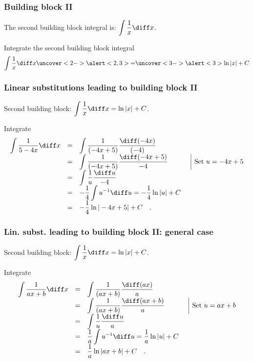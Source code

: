 \begin{frame}
\frametitle{Building block II}
The second building block integral is: $\displaystyle \int \frac{1}{x }\diff x$. 
\begin{example} Integrate the second building block integral 
\[
\int \frac{1}{x }\diff x \uncover<2->{\alert<2,3>{ =}}\uncover<3->{\alert<3>{\ln | x | +C} }
\]
\end{example}
\end{frame}
\begin{frame}
\frametitle{Linear substitutions leading to building block II}
Second building block: $\displaystyle \int \frac{1}{x }\diff x=\ln |x|+ C$. 
\begin{example} Integrate 
\[
\begin{array}{rcll|l}
\displaystyle \int \frac{1}{5-4x }\diff x&=&\displaystyle \int \frac{1}{(-4x+5) }\frac{\diff (-4 x)}{(-4)} \\
&=&\displaystyle \int \frac{1}{(-4x+5) }\frac{\diff (-4x+5)}{-4} &&\text{Set }u=-4x+5\\
&=&\displaystyle \int\frac{1}{u}\frac{\diff u}{-4}\\
&=&\displaystyle -\frac{1}{4}\int u^{-1} \diff u =-\frac{1}{4}\ln |u|+C\\
&=&\displaystyle-\frac{1}{4}\ln |-4x+5|  +C\quad .
\end{array}
\]

\end{example}
\end{frame}
\begin{frame}
\frametitle{Lin. subst. leading to building block II: general case}
Second building block: $\displaystyle \int \frac{1}{x }\diff x=\ln |x|+ C$. 
\begin{example} Integrate 
\[
\begin{array}{rcll|l}
\displaystyle \int \frac{1}{ax+b }\diff x&=&\displaystyle \int \frac{1}{(ax+b) }\frac{\diff (a x)}{a} \\
&=&\displaystyle \int \frac{1}{(ax+b) }\frac{\diff (ax+b)}{a} &&\text{Set }u=ax+b\\
&=&\displaystyle \int\frac{1}{u}\frac{\diff u}{a}\\
&=&\displaystyle \frac{1}{a}\int u^{-1} \diff u =\frac{1}{a}\ln |u|+C\\
&=&\displaystyle \frac{1}{a}\ln |ax+b|  +C\quad .
\end{array}
\]

\end{example}
\end{frame}


